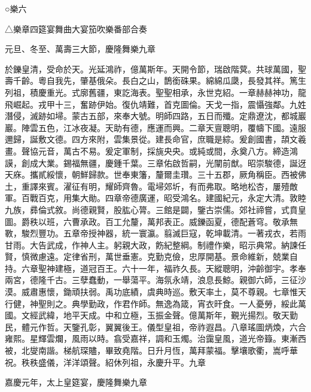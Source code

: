 
\begin{pinyinscope}
○樂六

△樂章四筵宴舞曲大宴笳吹樂番部合奏

元旦、冬至、萬壽三大節，慶隆舞樂九章

於鑠皇清，受命於天。光延鴻祚，億萬斯年。天開令節，瑞啟階蓂。共球萬國，聖壽千齡。粵自我先，肇基俄朵。長白之山，鵲銜硃果。綿綿瓜瓞，長發其祥。篤生列祖，積慶重光。式廓舊疆，東訖海表。聖聖相承，永世克紹。一章赫赫神功，龍飛崛起。戎甲十三，奮跡伊始。復仇靖難，首克圖倫。天戈一指，震懾強鄰。九姓潛侵，滅跡如埽。蒙古五部，來奉大號。明師四路，五日而殲。定鼎遼沈，都城巖巖。陣雲五色，江冰夜凝。天助有德，應運而興。二章天亶聰明，覆幬下國。遠服邇歸，誕敷文德。四方來附，雲集景從。建長命官，庶職是綜。爰創國書，頡文羲畫。聲協元音，萬古不易。爰定軍制，採旐央央。或純或間，永奠八方。締造鴻謨，創成大業。錫福無疆，慶鍾千葉。三章佑啟哲嗣，光闡前猷。昭崇駿德，誕迓天庥。攜貳綏懷，朝鮮歸款。世奉東籓，釐爾圭瓚。三十五郡，厥角稱臣。西被佛土，重譯來賓。濯征有明，耀師齊魯。電埽郊圻，有而弗取。略地松杏，屢殪敵軍。百戰百克，用集大勛。四章帝德廣運，昭受鴻名。建國紀元，永定大清。敦睦九族，彞倫式敘。尚德親賢，股肱心膂。三館是闢，鑒古崇儒。郊社禘嘗，式賁皇圖。爵秩以班，六曹承政。百工允釐，萬邦表正。威鑠函夏，德配蒼穹。敬承無斁，駿烈豐功。五章帝授神器，統一寰瀛。翦滅巨寇，乾坤載清。一著戎衣，若雨甘雨。大告武成，作神人主。躬親大政，飭紀整綱。制禮作樂，昭示典常。納諫任賢，慎微慮遠。定律省刑，萬世垂憲。克勤克儉，忠厚開基。景命維新，兢業自持。六章聖神建極，道冠百王。六十一年，福祚久長。天縱聰明，沖齡御宇。孝奉兩宮，德隆千古。三孽蠢動，一舉蕩平。海氛永靖，浪息長鯨。親御六師，三征沙漠。威肅惠懷，鋤頑扶弱。禹功底績，虞典時巡。敷天率土，莫不尊親。七章惟天行健，神聖則之。典學勤政，作君作師。無逸為箴，宵衣旰食。一人憂勞，綏此萬國。文經武緯，地平天成。中和立極，玉振金聲。億萬斯年，覲光揚烈。敬天勤民，體元作哲。天鑒孔彰，翼翼後王。儀型皇祖，帝祚遐昌。八章瑤圖炳煥，六合雍熙。星輝雲爛，風雨以時。翕受嘉祥，調和玉燭。治靄皇風，道光帝籙。東漸西被，北燮南諧。梯航琛贐，畢致堯階。日升月恆，萬拜蒙福。擊壤歌衢，嵩呼華祝。秩秩盛儀，洋洋頌聲。紹休列祖，永慶升平。九章

嘉慶元年，太上皇筵宴，慶隆舞樂九章


\end{pinyinscope}
